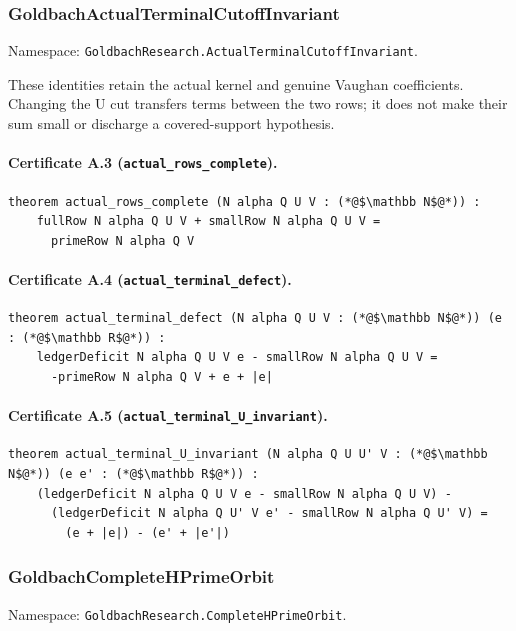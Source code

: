 \documentclass[11pt,a4paper]{article}
\theoremstyle{definition}
\theoremstyle{remark}
\begin{document}
\subsubsection{GoldbachActualTerminalCutoffInvariant}
Namespace: \nolinkurl{GoldbachResearch.ActualTerminalCutoffInvariant}.

These identities retain the actual kernel and genuine Vaughan coefficients. Changing the U cut transfers terms between the two rows; it does not make their sum small or discharge a covered-support hypothesis.

\paragraph{Certificate A.3 (\texttt{actual\_rows\_complete}).}
\begin{lstlisting}
theorem actual_rows_complete (N alpha Q U V : (*@$\mathbb N$@*)) :
    fullRow N alpha Q U V + smallRow N alpha Q U V =
      primeRow N alpha Q V
\end{lstlisting}

\paragraph{Certificate A.4 (\texttt{actual\_terminal\_defect}).}
\begin{lstlisting}
theorem actual_terminal_defect (N alpha Q U V : (*@$\mathbb N$@*)) (e : (*@$\mathbb R$@*)) :
    ledgerDeficit N alpha Q U V e - smallRow N alpha Q U V =
      -primeRow N alpha Q V + e + |e|
\end{lstlisting}

\paragraph{Certificate A.5 (\texttt{actual\_terminal\_U\_invariant}).}
\begin{lstlisting}
theorem actual_terminal_U_invariant (N alpha Q U U' V : (*@$\mathbb N$@*)) (e e' : (*@$\mathbb R$@*)) :
    (ledgerDeficit N alpha Q U V e - smallRow N alpha Q U V) -
      (ledgerDeficit N alpha Q U' V e' - smallRow N alpha Q U' V) =
        (e + |e|) - (e' + |e'|)
\end{lstlisting}

\subsubsection{GoldbachCompleteHPrimeOrbit}
Namespace: \nolinkurl{GoldbachResearch.CompleteHPrimeOrbit}.
\end{document}

